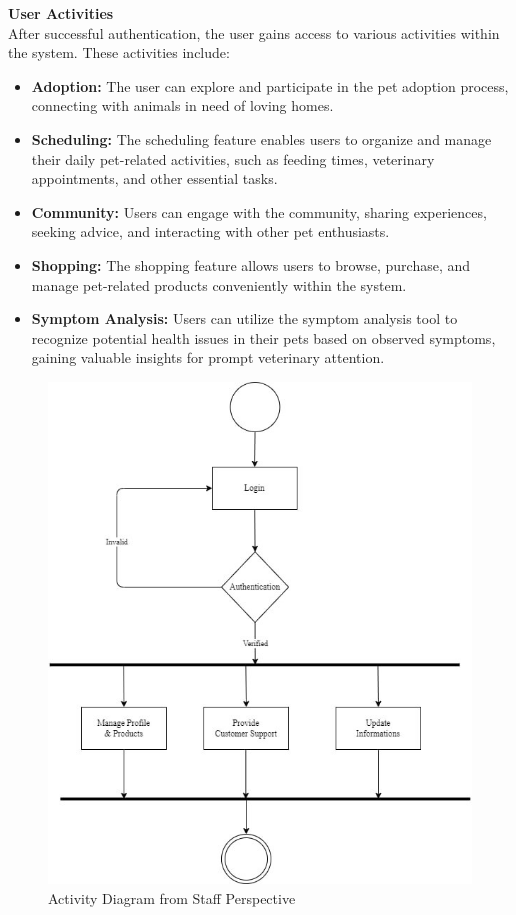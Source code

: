 \noindent\textbf{User Activities}\\ After successful authentication, the user gains access to various activities within the system. These activities include:
\begin{itemize}
  \item \textbf{Adoption:} The user can explore and participate in the pet adoption process, connecting with animals in need of loving homes.
  \item \textbf{Scheduling:} The scheduling feature enables users to organize and manage their daily pet-related activities, such as feeding times, veterinary appointments, and other essential tasks.
  \item \textbf{Community:} Users can engage with the community, sharing experiences, seeking advice, and interacting with other pet enthusiasts.
  \item \textbf{Shopping:} The shopping feature allows users to browse, purchase, and manage pet-related products conveniently within the system.
  \item \textbf{Symptom Analysis:} Users can utilize the symptom analysis tool to recognize potential health issues in their pets based on observed symptoms, gaining valuable insights for prompt veterinary attention.
\end{itemize}





\newpage
\vspace{2cm}
\begin{figure}[H]
\centering
\includegraphics[width=0.9\linewidth]{img/staff.jpg}
\caption[Activity Diagram from Staff Perspective]{Activity Diagram from Staff Perspective}
\label{fig:activity-staff}
\end{figure}

